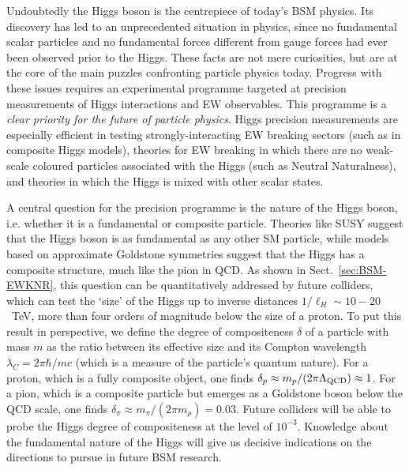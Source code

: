 \documentclass[../report.tex]{subfiles}
\begin{document}
\noindent Undoubtedly the Higgs boson is the centrepiece of today's BSM physics. Its discovery has led to an unprecedented situation in physics, since no fundamental scalar particles and no fundamental forces different from gauge forces had ever been observed prior to the Higgs. These facts are not mere curiosities, but are at the core of the main puzzles confronting particle physics today. 
Progress with these issues requires an experimental programme targeted at precision measurements of Higgs interactions and EW observables. This programme is a {\it clear priority for the future of particle physics}. Higgs precision measurements are especially efficient in testing strongly-interacting EW breaking sectors (such as in composite Higgs models), theories for EW breaking in which there are no weak-scale coloured particles associated with the Higgs (such as Neutral Naturalness), and theories in which the Higgs is mixed with other scalar states.

A central question for the precision programme is the nature of the Higgs boson, i.e. whether it is a fundamental or composite particle. Theories like SUSY suggest that the Higgs boson is as fundamental as any other SM particle, while models based on approximate Goldstone symmetries suggest that the Higgs has a composite structure, much like the pion in QCD. As shown in Sect.~\ref{sec:BSM-EWKNR}, this question can be quantitatively addressed by future colliders, which can test the `size' of the Higgs up to inverse distances $1/\ell_H \sim 10-20$~TeV, more than four orders of magnitude below the size of a proton. To put this result in perspective, we define the degree of compositeness $\delta$ of a particle with mass $m$ as the ratio between its effective size and its Compton wavelength $\lambda_C = 2\pi \hbar /m c$ (which is a measure of the particle's quantum nature). For a proton, which is a fully composite object, one finds $\delta_p \approx m_p/(2\pi \Lambda_{\rm QCD})\approx 1$. For a pion, which is a composite particle but emerges as a Goldstone boson below the QCD scale, one finds $\delta_\pi \approx m_\pi /(2\pi m_\rho ) =0.03$. Future colliders will be able to probe the Higgs degree of compositeness at the level of $10^{-3}$. Knowledge about the fundamental nature of the Higgs will give us decisive indications on the directions to pursue in future BSM research.
\end{document}
